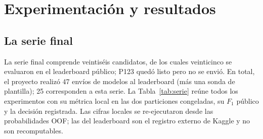 \section{Experimentación y resultados}
\label{sec:resultados}

\subsection{La serie final}

La serie final comprende veintiséis candidatos, de los cuales veinticinco se
evaluaron en el leaderboard público; P123 quedó listo pero no se envió. En
total, el proyecto realizó 47 envíos de modelos al leaderboard (más una
sonda de plantilla); 25 corresponden a esta
serie. La Tabla~\ref{tab:serie} reúne todos los experimentos con su métrica local en
las dos particiones congeladas, su $F_1$ público y la decisión registrada.
Las cifras locales se re-ejecutaron desde las probabilidades OOF; las del
leaderboard son el registro externo de Kaggle y no son recomputables.

